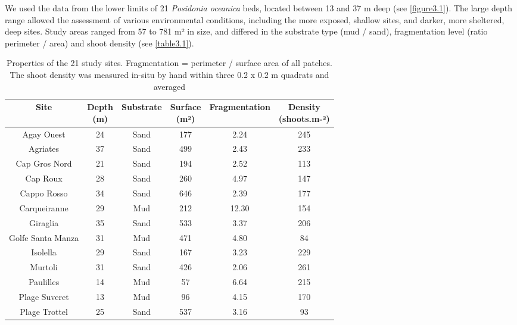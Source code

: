 We used the data from the lower limits of 21 \textit{Posidonia oceanica} beds, located between 13 and 37 m deep (see \autoref{figure3.1}). The large depth range allowed the assessment of various environmental conditions, including the more exposed, shallow sites, and darker, more sheltered, deep sites. Study areas ranged from 57 to 781 m² in size, and differed in the substrate type (mud / sand), fragmentation level (ratio perimeter / area) and shoot density (see \autoref{table3.1}).

\begin{table}[H]
  \centering
  \normalsize
  \caption[Properties of the 21 study sites]{Properties of the 21 study sites. Fragmentation = perimeter / surface area of all patches. The shoot density was measured in-situ by hand within three 0.2 x 0.2 m quadrats and averaged}
  \label{table3.1}
    \begin{tabular}{*{6}{c}}
        \toprule
        \textbf{Site} & \makecell{\textbf{Depth} \\ \textbf{(m)}} & \textbf{Substrate} & \makecell{\textbf{Surface} \\ \textbf{(m²)}} & \textbf{Fragmentation} & \makecell{\textbf{Density} \\ \textbf{(shoots.m-²)}} \\ \midrule
        Agay Ouest & 24 & Sand & 177 & 2.24 & 245 \\
        Agriates & 37 & Sand & 499 & 2.43 & 233 \\
        Cap Gros Nord & 21 & Sand & 194 & 2.52 & 113 \\
        Cap Roux & 28 & Sand & 260 & 4.97 & 147 \\
        Cappo Rosso & 34 & Sand & 646 & 2.39 & 177 \\
        Carqueiranne & 29 & Mud & 212 & 12.30 & 154 \\
        Giraglia & 35 & Sand & 533 & 3.37 & 206 \\
        Golfe Santa Manza & 31 & Mud & 471 & 4.80 & 84 \\
        Isolella & 29 & Sand & 167 & 3.23 & 229 \\
        Murtoli & 31 & Sand & 426 & 2.06 & 261 \\
        Paulilles & 14 & Mud & 57 & 6.64 & 215 \\
        Plage Suveret & 13 & Mud & 96 & 4.15 & 170 \\
        Plage Trottel & 25 & Sand & 537 & 3.16 & 93 \\

\end{tabular}
\end{table}
